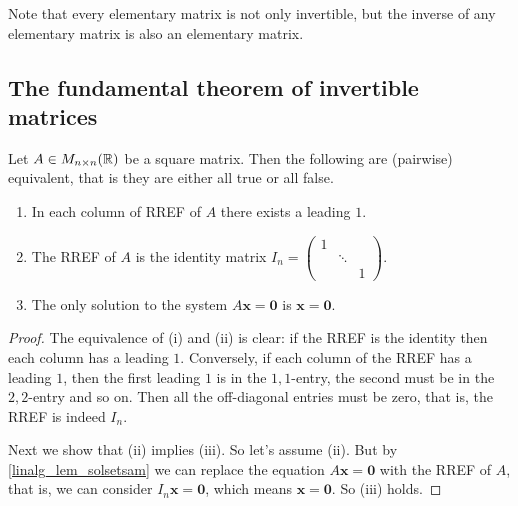 \documentclass[10pt, a4paper]{article}
\newcommand{\mbf}[1]{\mathbf{#1}}
\begin{document}
\begin{remark}
    Note that every elementary matrix is not only invertible,
    but the inverse of any elementary matrix is also an elementary matrix.
\end{remark}

\subsection{The fundamental theorem of invertible matrices}
\begin{lemma}\label{linalg_lem_sqmatrrefcond}
    Let $A \in M_{n \times n}(\mathbb{R})$ be a square matrix.
    Then the following are (pairwise) equivalent,
    that is they are either all true or all false.
    \begin{enumerate}[label = (\roman*)]
        \item In each column of RREF of $A$ there exists a leading $1$.
        \item The RREF of $A$ is the identity matrix $I_n = \begin{pmatrix}
            1 & \phantom{} & \phantom{} \\
            \phantom{} & \ddots & \phantom{} \\
            \phantom{} & \phantom{} & 1
        \end{pmatrix}$.
        \item The only solution to the system $A\mbf{x} = \mbf{0}$ is $\mbf{x} = \mbf{0}$.
    \end{enumerate}
    \begin{proof}
        The equivalence of (i) and (ii) is clear:
        if the RREF is the identity then each column has a leading $1$.
        Conversely, if each column of the RREF has a leading $1$,
        then the first leading $1$ is in the $1, 1$-entry,
        the second must be in the $2, 2$-entry and so on.
        Then all the off-diagonal entries must be zero,
        that is, the RREF is indeed $I_n$.

        Next we show that (ii) implies (iii).
        So let's assume (ii).
        But by \autoref{linalg_lem_solsetsam} we can replace the equation $A\mbf{x} = \mbf{0}$ with the RREF of $A$,
        that is, we can consider $I_n\mbf{x} = \mbf{0}$,
        which means $\mbf{x} = \mbf{0}$.
        So (iii) holds.


\end{proof}
\end{lemma}
\end{document}

